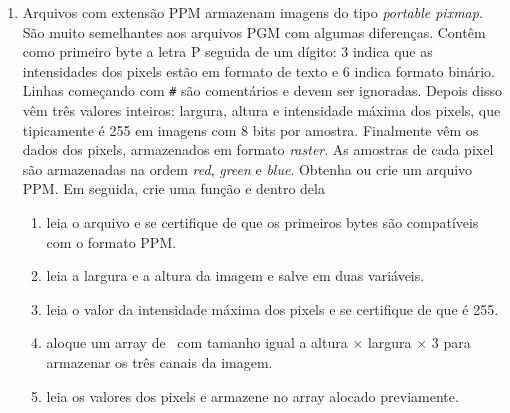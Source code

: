 \begin{enumerate}
  \item Arquivos com extensão PPM armazenam imagens do tipo \textit{portable pixmap}. São muito semelhantes aos arquivos PGM com algumas diferenças. Contêm como primeiro byte a letra P seguida de um dígito: 3 indica que as intensidades dos pixels estão em formato de texto e 6 indica formato binário. Linhas começando com {\tt \#} são comentários e devem ser ignoradas. Depois disso vêm três valores inteiros: largura, altura e intensidade máxima dos pixels, que tipicamente é 255 em imagens com 8 bits por amostra. Finalmente vêm os dados dos pixels, armazenados em formato \textit{raster}. As amostras de cada pixel são armazenadas na ordem \textit{red}, \textit{green} e \textit{blue}. Obtenha ou crie um arquivo PPM. Em seguida, crie uma função \MAIN e dentro dela
    \begin{enumerate}
      \item leia o arquivo e se certifique de que os primeiros bytes são compatíveis com o formato PPM.
      \item leia a largura e a altura da imagem e salve em duas variáveis.
      \item leia o valor da intensidade máxima dos pixels e se certifique de que é 255.
      \item aloque um array de \CHAR\ com tamanho igual a altura $\times$ largura $\times$ 3 para armazenar os três canais da imagem.
      \item leia os valores dos pixels e armazene no array alocado previamente.
    \end{enumerate}
    
\end{enumerate}
